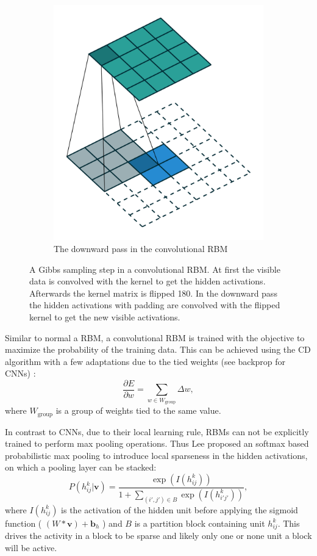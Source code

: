 \begin{figure}
\begin{subfigure}[t]{.30\textwidth}
  		\includegraphics[width=.8\linewidth]{imgs/crbm_padding2.png}
  		\caption{The downward pass in the convolutional RBM}
  		\label{fig:sub3}
	\end{subfigure}
	\caption{A Gibbs sampling step in a convolutional RBM. At first the visible data is convolved with the kernel to get the hidden activations. Afterwards the kernel matrix is flipped 180\textdegree . In the downward pass the hidden activations with padding are convolved with the flipped kernel to get the new visible activations.}
	\label{fig:convrbm}
\end{figure}


Similar to normal a RBM, a convolutional RBM is trained with the objective to maximize the probability of the training data.
This can be achieved using the CD algorithm with a few adaptations due to the tied weights (see backprop for CNNs) :
\[
\frac{\partial E}{\partial w} = \sum_{w \in W_{\text{group}}} \Delta w,
\]
where $W_{\text{group}}$ is a group of weights tied to the same value.

In contrast to CNNs, due to their local learning rule, RBMs can not be explicitly trained to perform max pooling operations.
Thus Lee proposed an softmax based probabilistic max pooling to introduce local sparseness in the hidden activations, on which a pooling layer can be stacked:
\[
P(h^k_{ij} | \textbf{v}) = \frac{\exp(I(h^k_{ij}))}{1 + \sum_{(i',j') \in B} \exp(I(h^k_{i'j'}))},
\]
where $I(h^k_{ij})$ is the activation of the hidden unit before applying the sigmoid function ( $(W * \textbf{v}) + \textbf{b}_{h}$ ) and $B$ is a partition block containing unit $h^k_{ij}$. 
This drives the activity in a block to be sparse and likely only one or none unit a block will be active.

